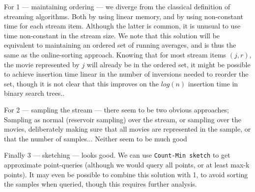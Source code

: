 For 1 --- maintaining ordering --- we diverge from the classical definition of
streaming algorithms. Both by using linear memory, and by using non-constant
time for each stream item. Although the latter is common, it is unusual to use
time non-constant in the stream size. We note that this solution will be
equivalent to maintaining an ordered set of running averages, and is thus the
same as the online-sorting approach. Knowing that for most stream items $(j,r)$,
the movie represented by $j$ will already be in the ordered set, it might be
possible to achieve insertion time linear in the number of inversions needed to
reorder the set, though it is not clear that this improves on the
$log(n)$ insertion time in binary search trees..

For 2 --- sampling the stream --- there seem to be two obvious approaches;
Sampling as normal (reservoir sampling) over the stream, or sampling over the
movies, deliberately making sure that all movies are represented in the sample,
or that the number of samples...
Neither seem to be much good

Finally 3 --- sketching --- looks good. We can use \texttt{Count-Min sketch} to
get approximate point-queries (although we would query all points, or at least
max-k points). It may even be possible to combine this solution
with 1, to avoid sorting the samples when queried, though this requires further
analysis.

